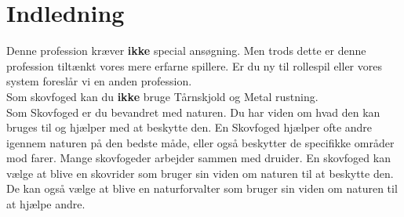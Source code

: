 
\chapter*{Indledning}

Denne profession kræver \textbf{ikke} special ansøgning. Men trods dette er denne profession tiltænkt vores mere erfarne spillere. Er du ny til rollespil eller vores system foreslår vi en anden profession.\\
Som skovfoged kan du \textbf{ikke} bruge Tårnskjold og Metal rustning.\\

Som Skovfoged er du bevandret med naturen. Du har viden om hvad den kan bruges til og hjælper med at beskytte den. En Skovfoged hjælper ofte andre igennem naturen på den bedste måde, eller også beskytter de specifikke områder mod farer. Mange skovfogeder arbejder sammen med druider. En skovfoged kan vælge at blive en skovrider som bruger sin viden om naturen til at beskytte den. De kan også vælge at blive en naturforvalter som bruger sin viden om naturen til at hjælpe andre. 
